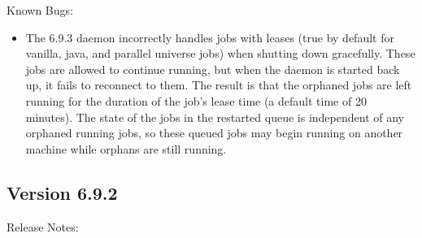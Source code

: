 \noindent Known Bugs:

\begin{itemize}

\item The 6.9.3  daemon incorrectly handles jobs with leases
(true by default for vanilla, java, and parallel universe jobs) when
shutting down gracefully.  These jobs are allowed to continue running,
but when the  daemon is started back up, it fails to reconnect
to them.  The result is that the orphaned jobs are left running for
the duration of the job's lease time (a default time of 20 minutes).
The state of the jobs in the restarted queue is independent of any
orphaned running jobs, so these queued jobs may begin running on another
machine while orphans are still running.

\end{itemize}

\subsection*{\label{sec:New-6-9-2}Version 6.9.2}

\noindent Release Notes:

